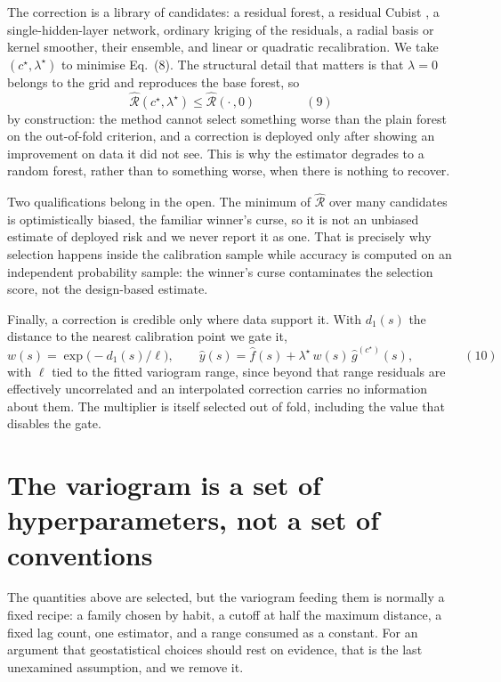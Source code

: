 \documentclass[preprint,12pt,authoryear]{elsarticle}
\newcommand{\eqnum}[1]{\qquad\qquad\mathrm{(#1)}}
\begin{document}
The correction is a library of candidates: a residual forest, a residual Cubist
\citep{quinlan1992}, a single-hidden-layer network, ordinary kriging of the
residuals, a radial basis or kernel smoother, their ensemble, and linear or
quadratic recalibration. We take $(c^\star,\lambda^\star)$ to minimise Eq.~(8).
The structural detail that matters is that $\lambda = 0$ belongs to the grid and
reproduces the base forest, so
\[
\widehat{\mathcal{R}}(c^\star,\lambda^\star) \le \widehat{\mathcal{R}}(\cdot\,,0)
\eqnum{9}
\]
by construction: the method cannot select something worse than the plain forest
on the out-of-fold criterion, and a correction is deployed only after showing an
improvement on data it did not see. This is why the estimator degrades to a
random forest, rather than to something worse, when there is nothing to recover.

Two qualifications belong in the open. The minimum of $\widehat{\mathcal{R}}$
over many candidates is optimistically biased, the familiar winner's curse, so
it is not an unbiased estimate of deployed risk and we never report it as one.
That is precisely why selection happens inside the calibration sample while
accuracy is computed on an independent probability sample: the winner's curse
contaminates the selection score, not the design-based estimate.

Finally, a correction is credible only where data support it. With $d_1(s)$ the
distance to the nearest calibration point we gate it,
\[
w(s) = \exp\!\big(-d_1(s)/\ell\big),
\qquad
\hat y(s) = \hat f(s) + \lambda^\star\, w(s)\, \hat g^{(c^\star)}(s),
\eqnum{10}
\]
with $\ell$ tied to the fitted variogram range, since beyond that range
residuals are effectively uncorrelated and an interpolated correction carries no
information about them. The multiplier is itself selected out of fold, including
the value that disables the gate.

\section{The variogram is a set of hyperparameters, not a set of conventions}
\label{sec:geohyper}

The quantities above are selected, but the variogram feeding them is normally a
fixed recipe: a family chosen by habit, a cutoff at half the maximum distance,
a fixed lag count, one estimator, and a range consumed as a constant. For an
argument that geostatistical choices should rest on evidence, that is the last
unexamined assumption, and we remove it.
\end{document}
